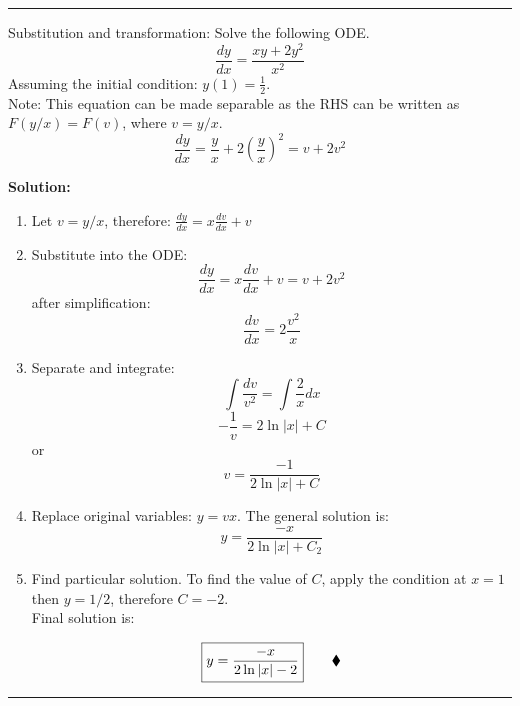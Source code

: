 \begin{center}
\noindent\rule{4cm}{0.4pt}
\end{center}

\begin{exmp}{Substitution and transformation:}
Solve the following ODE.
\begin{equation*}
\frac{dy}{dx}=\frac{xy+2y^2}{x^2}
\end{equation*}
Assuming the initial condition: $y(1)=\frac{1}{2}$.\\

Note: This equation can be made separable as the RHS can be written as $F(y/x)=F(v)$, where $v=y/x$.
\begin{equation*}
\frac{dy}{dx}=\frac{y}{x}+2\left(\frac{y}{x}\right)^2= v+2v^2
\end{equation*}

\textbf{Solution:}
\begin{enumerate}
\item Let $v=y/x$, therefore: $\frac{dy}{dx}=x\frac{dv}{dx}+v$
\item Substitute into the ODE:
\begin{equation*}
\frac{dy}{dx}=x\frac{dv}{dx}+v=v+2v^2
\end{equation*}
after simplification:
\begin{equation*}
\frac{dv}{dx}=2\frac{v^2}{x}
\end{equation*}

\item Separate and integrate:
\begin{equation*}
\int \frac{dv}{v^2}=\int \frac{2}{x}dx
\end{equation*}
\begin{equation*}
-\frac{1}{v}=2 \ln\left|x\right| +C
\end{equation*}
or
\begin{equation*}
v=\frac{-1}{2 \ln\left|x\right|+C}
\end{equation*}
\item Replace original variables: $y=vx$. The general solution is:
\begin{equation*}
y=\frac{-x}{2 \ln\left|x\right|+C_2}
\end{equation*}
\item Find particular solution. To find the value of $C$, apply the condition at $x=1$ then $y=1/2$, therefore $C=-2$.\\
Final solution is:

\begin{equation*}
\boxed{y=\frac{-x}{2 \ln\left|x\right|-2}}\qquad \mathbin{\blacklozenge}
\end{equation*}

\end{enumerate}
\begin{center}
\noindent\rule{4cm}{0.4pt}
\end{center}
\end{exmp}


